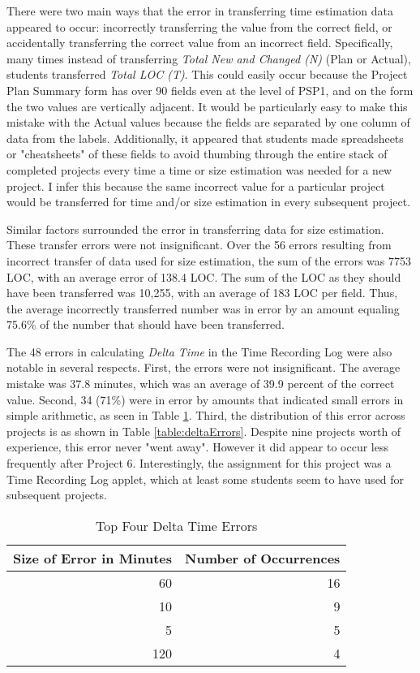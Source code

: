 \newpage
There were two main ways that the error in transferring time estimation
data appeared to occur: incorrectly transferring the value from the correct
field, or accidentally transferring the correct value from an incorrect
field.  Specifically, many times instead of transferring {\it Total New and
  Changed (N)} (Plan or Actual), students transferred {\it Total LOC (T)}.
This could easily occur because the Project Plan Summary form has over 90
fields even at the level of PSP1, and on the form the two values are
vertically adjacent. It would be particularly easy to make this mistake
with the Actual values because the fields are separated by one column of
data from the labels.  Additionally, it appeared that students made
spreadsheets or "cheatsheets" of these fields to avoid thumbing through the
entire stack of completed projects every time a time or size estimation was
needed for a new project.  I infer this because the same incorrect value
for a particular project would be transferred for time and/or size
estimation in every subsequent project.

Similar factors surrounded the error in transferring data for size
estimation.  These transfer errors were not insignificant.  Over the 56
errors resulting from incorrect transfer of data used for size estimation,
the sum of the errors was 7753 LOC, with an average error of 138.4 LOC.
The sum of the LOC as they should have been transferred was 10,255, with an
average of 183 LOC per field.  Thus, the average incorrectly transferred
number was in error by an amount equaling 75.6\% of the number that should
have been transferred.

The 48 errors in calculating {\it Delta Time} in the Time Recording Log
were also notable in several respects.  First, the errors were not
insignificant.  The average mistake was 37.8 minutes, which was an average
of 39.9 percent of the correct value. Second, 34 (71\%) were in error by
amounts that indicated small errors in simple arithmetic, as seen in Table
\ref{table:deltaAmounts}. Third, the distribution of this error across
projects is as shown in Table \ref{table:deltaErrors}.  Despite nine projects
worth of experience, this error never "went away".  However it did appear
to occur less frequently after Project 6.  Interestingly, the assignment
for this project was a Time Recording Log applet, which at least some
students seem to have used for subsequent projects.

\begin{table} [htbp] 
\begin{center}
\caption{\label{table:deltaAmounts}Top Four Delta Time Errors} 
\begin{tabular}{|r|r|}\hline 
Size of Error in Minutes & Number of Occurrences \\ \hline\hline 
 60 & 16 \\ \hline 
 10 &  9 \\ \hline 
  5 &  5 \\ \hline 
120 &  4 \\ \hline 
\end{tabular}
\end{center} 
\end{table}


